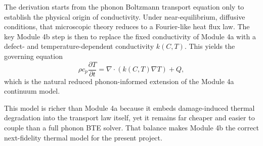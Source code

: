 \documentclass[11pt]{article}
\begin{document}
The derivation starts from the phonon Boltzmann transport equation only to establish the physical origin of conductivity. Under near-equilibrium, diffusive conditions, that microscopic theory reduces to a Fourier-like heat flux law. The key Module 4b step is then to replace the fixed conductivity of Module 4a with a defect- and temperature-dependent conductivity $k(C,T)$. This yields the governing equation
\[
\rho c_p \frac{\partial T}{\partial t} = \nabla\cdot\left(k(C,T)\nabla T\right)+Q,
\]
which is the natural reduced phonon-informed extension of the Module 4a continuum model.

This model is richer than Module 4a because it embeds damage-induced thermal degradation into the transport law itself, yet it remains far cheaper and easier to couple than a full phonon BTE solver. That balance makes Module 4b the correct next-fidelity thermal model for the present project.
\end{document}

